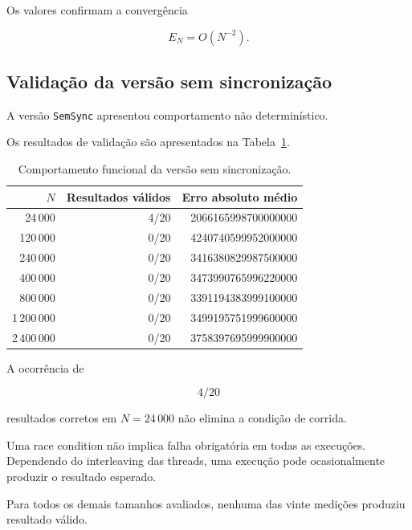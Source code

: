 Os valores confirmam a convergência

\begin{equation}
    E_N=O(N^{-2}).
\end{equation}


\subsection{Validação da versão sem sincronização}

A versão \texttt{SemSync} apresentou comportamento não determinístico.

Os resultados de validação são apresentados na
Tabela~\ref{tab:atvd06-semsync}.

\begin{table}[htbp]
    \centering
    \caption{Comportamento funcional da versão sem sincronização.}
    \label{tab:atvd06-semsync}
    \small

    \begin{tabular}{r|r|r}
        \hline
        \(N\) & Resultados válidos & Erro absoluto médio \\
        \hline
        24\,000    & 4/20 & 2066165998700000000 \\
        120\,000   & 0/20 & 4240740599952000000 \\
        240\,000   & 0/20 & 3416380829987500000 \\
        400\,000   & 0/20 & 3473990765996220000 \\
        800\,000   & 0/20 & 3391194383999100000 \\
        1\,200\,000 & 0/20 & 3499195751999600000 \\
        2\,400\,000 & 0/20 & 3758397695999900000 \\
        \hline
    \end{tabular}
\end{table}

A ocorrência de

\begin{equation}
    4/20
\end{equation}

resultados corretos em \(N=24\,000\) não elimina a condição de corrida.

Uma race condition não implica falha obrigatória em todas as execuções.
Dependendo do interleaving das threads, uma execução pode ocasionalmente
produzir o resultado esperado.

Para todos os demais tamanhos avaliados, nenhuma das vinte medições produziu
resultado válido.

